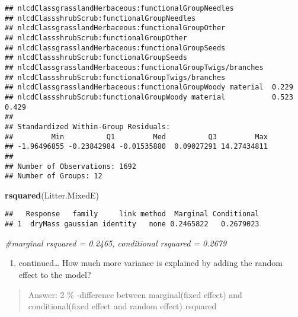 \documentclass[]{article}
\newenvironment{Shaded}{\begin{snugshade}}{\end{snugshade}}
\newcommand{\CommentTok}[1]{\textcolor[rgb]{0.56,0.35,0.01}{\textit{#1}}}
\newcommand{\KeywordTok}[1]{\textcolor[rgb]{0.13,0.29,0.53}{\textbf{#1}}}
\newcommand{\NormalTok}[1]{#1}
\providecommand{\tightlist}{%
  \setlength{\itemsep}{0pt}\setlength{\parskip}{0pt}}
\begin{document}
\begin{verbatim}
## nlcdClassgrasslandHerbaceous:functionalGroupNeedles                     
## nlcdClassshrubScrub:functionalGroupNeedles                              
## nlcdClassgrasslandHerbaceous:functionalGroupOther                       
## nlcdClassshrubScrub:functionalGroupOther                                
## nlcdClassgrasslandHerbaceous:functionalGroupSeeds                       
## nlcdClassshrubScrub:functionalGroupSeeds                                
## nlcdClassgrasslandHerbaceous:functionalGroupTwigs/branches              
## nlcdClassshrubScrub:functionalGroupTwigs/branches                       
## nlcdClassgrasslandHerbaceous:functionalGroupWoody material  0.229       
## nlcdClassshrubScrub:functionalGroupWoody material           0.523  0.429
## 
## Standardized Within-Group Residuals:
##         Min          Q1         Med          Q3         Max 
## -1.96496855 -0.23842984 -0.01535880  0.09027291 14.27434811 
## 
## Number of Observations: 1692
## Number of Groups: 12
\end{verbatim}

\begin{Shaded}
\begin{Highlighting}[]
\KeywordTok{rsquared}\NormalTok{(Litter.MixedE)}
\end{Highlighting}
\end{Shaded}

\begin{verbatim}
##   Response   family     link method  Marginal Conditional
## 1  dryMass gaussian identity   none 0.2465822   0.2679023
\end{verbatim}

\begin{Shaded}
\begin{Highlighting}[]
\CommentTok{#marginal rsquared = 0.2465, conditional rsquared = 0.2679}
\end{Highlighting}
\end{Shaded}

\begin{enumerate}
\def\labelenumi{\alph{enumi}.}
\setcounter{enumi}{1}
\tightlist
\item
  continued\ldots{} How much more variance is explained by adding the
  random effect to the model?
\end{enumerate}

\begin{quote}
Answer: 2 \% -difference between marginal(fixed effect) and
conditional(fixed effect and random effect) rsquared
\end{quote}
\end{document}
